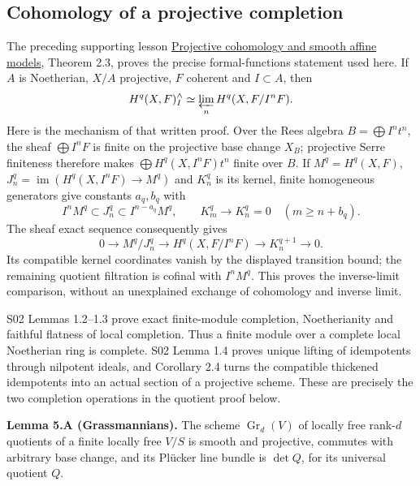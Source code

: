\documentclass[11pt,a4paper,openany]{report}
\begin{document}
\subsection{Cohomology of a projective completion}\label{AG-RG-03-cohomology-of-a-projective-completion}

The preceding supporting lesson \href{https://github.com/KokunoYumeto/open-math-courses/blob/main/docs/courses/AG-RG/AG-RG-S02.md}{Projective cohomology and smooth affine models}, Theorem 2.3, proves the precise formal-functions statement used here. If \(A\) is Noetherian, \(X/A\) projective, \(F\) coherent and \(I\subset A\), then \[
H^q(X,F)^\wedge_I
\simeq\varprojlim_nH^q(X,F/I^nF).
\] Here is the mechanism of that written proof. Over the Rees algebra \(B=\bigoplus I^nt^n\), the sheaf \(\bigoplus I^nF\) is finite on the projective base change \(X_B\); projective Serre finiteness therefore makes \(\bigoplus H^q(X,I^nF)t^n\) finite over \(B\). If \(M^q=H^q(X,F)\), \(J_n^q=\operatorname{im}(H^q(X,I^nF)\to M^q)\) and \(K_n^q\) is its kernel, finite homogeneous generators give constants \(a_q,b_q\) with \[
I^nM^q\subset J_n^q\subset I^{n-a_q}M^q,
\qquad K_m^q\longrightarrow K_n^q=0\quad(m\ge n+b_q).
\] The sheaf exact sequence consequently gives \[
0\longrightarrow M^q/J_n^q\longrightarrow H^q(X,F/I^nF)
\longrightarrow K_n^{q+1}\longrightarrow0.
\] Its compatible kernel coordinates vanish by the displayed transition bound; the remaining quotient filtration is cofinal with \(I^nM^q\). This proves the inverse-limit comparison, without an unexplained exchange of cohomology and inverse limit.

S02 Lemmas 1.2--1.3 prove exact finite-module completion, Noetherianity and faithful flatness of local completion. Thus a finite module over a complete local Noetherian ring is complete. S02 Lemma 1.4 proves unique lifting of idempotents through nilpotent ideals, and Corollary 2.4 turns the compatible thickened idempotents into an actual section of a projective scheme. These are precisely the two completion operations in the quotient proof below.

\label{AG-RG-03-ag-rg-03-grassmannian}

\textbf{Lemma 5.A (Grassmannians).} The scheme \(\operatorname{Gr}_d(V)\) of locally free rank-\(d\) quotients of a finite locally free \(V/S\) is smooth and projective, commutes with arbitrary base change, and its Plücker line bundle is \(\det Q\), for its universal quotient \(Q\).
\end{document}
